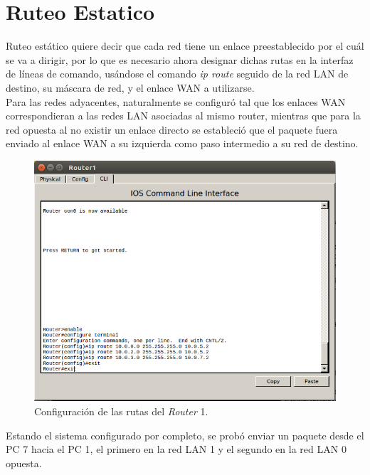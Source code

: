 \documentclass[spanish]{udpreport}
\begin{document}
\chapter{Ruteo Estatico}

Ruteo estático quiere decir que cada red tiene un enlace preestablecido por el cuál se va a dirigir, por lo que es necesario ahora designar dichas rutas en la interfaz de líneas de comando, usándose el comando \textit{ip route} seguido de la red LAN de destino, su máscara de red, y el enlace WAN a utilizarse. \\

Para las redes adyacentes, naturalmente se configuró tal que los enlaces WAN correspondieran a las redes LAN asociadas al mismo router, mientras que para la red opuesta al no existir un enlace directo se estableció que el paquete fuera enviado al enlace WAN a su izquierda como paso intermedio a su red de destino.

\begin{figure}[H]
	\begin{center}
		\includegraphics[width= 17cm]{Imagenes/config_estatico}
		\caption{Configuración de las rutas del \textit{Router} 1.}
	\end{center}
\end{figure}

Estando el sistema configurado por completo, se probó enviar un paquete desde el PC 7 hacia el PC 1, el primero en la red LAN 1 y el segundo en la red LAN 0 opuesta.
\end{document}
